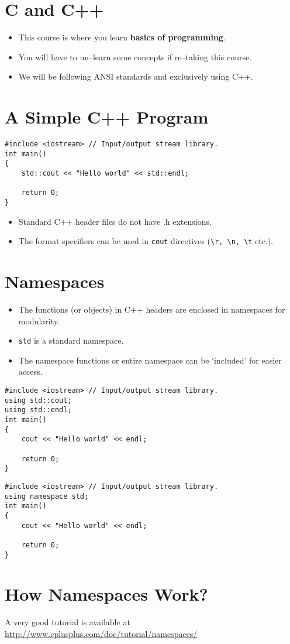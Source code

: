 \documentclass[12pt,a4paper]{article}
\begin{document}
\section{C and C++}
\begin{itemize}
\item This course is where you learn \textbf{basics of programming}.
\item You will have to un--learn some concepts if re--taking this course.
\item We will be following ANSI standards and exclusively using C++.
\end{itemize}
\section{A Simple C++ Program}
\begin{lstlisting}[caption={A Basic C++ Program}]
#include <iostream> // Input/output stream library.
int main()
{
	std::cout << "Hello world" << std::endl;
	
	return 0;
}
\end{lstlisting}
\begin{itemize}
\item Standard C++ header files do not have .h extensions.
\item The format specifiers can be used in \verb|cout| directives (\verb|\r, \n, \t| etc.).
\end{itemize}
\section{Namespaces}
\begin{itemize}
\item The functions (or objects) in C++ headers are enclosed in namespaces for modularity.
\item \texttt{std} is a standard namespace.
\item The namespace functions or entire namespace can be `included' for easier access.
\end{itemize}
\begin{lstlisting}[caption={The `using' Directive}]
#include <iostream> // Input/output stream library.
using std::cout;
using std::endl;
int main()
{
	cout << "Hello world" << endl;
	
	return 0;
}
\end{lstlisting}
\begin{lstlisting}[caption={Including a Namespace}]
#include <iostream> // Input/output stream library.
using namespace std;
int main()
{
	cout << "Hello world" << endl;
	
	return 0;
}
\end{lstlisting}
\section{How Namespaces Work?}
A very good tutorial is available at \url{http://www.cplusplus.com/doc/tutorial/namespaces/}
\end{document}
